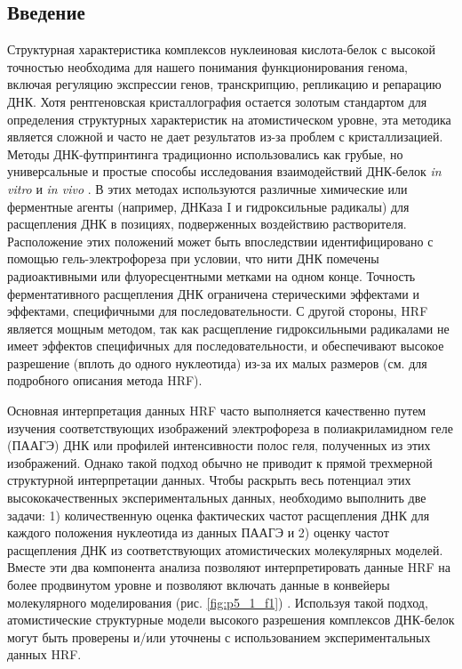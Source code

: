 \subsection{Введение}
    Структурная характеристика комплексов нуклеиновая кислота-белок с высокой точностью необходима для нашего понимания функционирования генома, включая регуляцию экспрессии генов, транскрипцию, репликацию и репарацию ДНК. Хотя рентгеновская кристаллография остается золотым стандартом для определения структурных характеристик на атомистическом уровне, эта методика является сложной и часто не дает результатов из-за проблем с кристаллизацией. Методы ДНК-футпринтинга традиционно использовались как грубые, но универсальные и простые способы исследования взаимодействий ДНК-белок \textit{in vitro} \cite{tullius_physical_1989} и \textit{in vivo} \cite{adilakshmi_hydroxyl_2006,song_dnase-seq_2010}. В этих методах используются различные химические или ферментные агенты (например, ДНКаза I и гидроксильные радикалы) для расщепления ДНК в позициях, подверженных воздействию растворителя. Расположение этих положений может быть впоследствии идентифицировано с помощью гель-электрофореза при условии, что нити ДНК помечены радиоактивными или флуоресцентными метками на одном конце. Точность ферментативного расщепления ДНК ограничена стерическими эффектами и эффектами, специфичными для последовательности. С другой стороны, HRF является мощным методом, так как расщепление гидроксильными радикалами не имеет эффектов специфичных для последовательности, и обеспечивают высокое разрешение (вплоть до одного нуклеотида) из-за их малых размеров (см. \cite{jain_footprinting_2008-1} для подробного описания метода HRF).
    
    Основная интерпретация данных HRF часто выполняется качественно путем изучения соответствующих изображений электрофореза в полиакриламидном геле (ПААГЭ) ДНК или профилей интенсивности полос геля, полученных из этих изображений. Однако такой подход обычно не приводит к прямой трехмерной структурной интерпретации данных. Чтобы раскрыть весь потенциал этих высококачественных экспериментальных данных, необходимо выполнить две задачи: 1) количественную оценка фактических частот расщепления ДНК для каждого положения нуклеотида из данных ПААГЭ и 2) оценку частот расщепления ДНК из соответствующих атомистических молекулярных моделей. Вместе эти два компонента анализа позволяют интерпретировать данные HRF на более продвинутом уровне и позволяют включать данные в конвейеры молекулярного моделирования (рис. \ref{fig:p5_1_f1}) \cite{armeev_modeling_2016}. Используя такой подход, атомистические структурные модели высокого разрешения комплексов ДНК-белок могут быть проверены и/или уточнены с использованием экспериментальных данных HRF.



